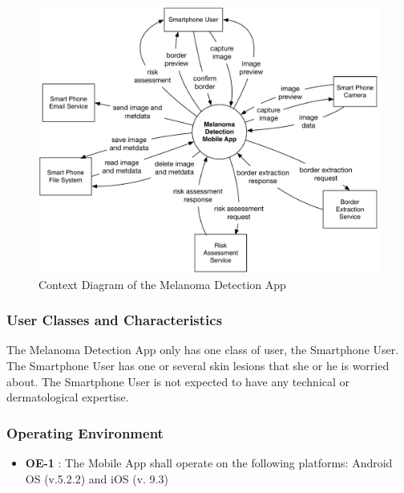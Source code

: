             \begin{figure}[H]
                \centering
                \includegraphics[width=\textwidth]{assets/requirements/ContextDiagram.pdf}
                \caption{Context Diagram of the Melanoma Detection App}
                \label{fig:partial_feature_tree}
            \end{figure}


        \subsubsection{User Classes and Characteristics}

            The Melanoma Detection App only has one class of user, the Smartphone User. The Smartphone User has one or several skin lesions that she or he is worried about.
The Smartphone User is not expected to have any technical or dermatological expertise.

        \subsubsection{Operating Environment}

                    \noindent
                    \begin{itemize}[leftmargin=*]
                        \item[]  \textbf{OE-1} : The Mobile App shall operate on the following platforms: Android OS (v.5.2.2) and iOS (v. 9.3)

                    \end{itemize}


